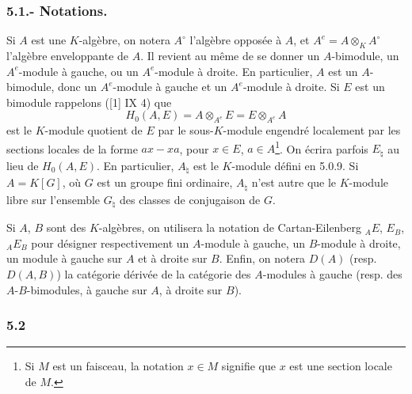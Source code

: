 \documentclass[11pt]{article}
\begin{document}
\subsubsection*{5.1.- Notations.}

Si $A$ est une $K$-algèbre, on notera $A^\circ$ l'algèbre opposée à $A$, et $A^e=A\otimes_KA^\circ$ l'algèbre enveloppante de $A$. Il revient au même de se donner un $A$-bimodule, un $A^e$-module à gauche, ou un $A^e$-module à droite. En particulier, $A$ est un $A$-bimodule, donc un $A^e$-module à gauche et un $A^e$-module à droite. Si $E$ est un bimodule rappelons ([1] IX 4) que
\[
H_0(A,E)=A\otimes_{A^e}E=E\otimes_{A^e}A
\]
est le $K$-module quotient de $E$ par le sous-$K$-module engendré localement par les sections locales de la forme $ax-xa$, pour $x\in E$, $a\in A$\footnote{Si $M$ est un faisceau, la notation $x\in M$ signifie que $x$ est une section locale de $M$.}. On écrira parfois $E_\natural$ au lieu de $H_0(A,E)$. En particulier, $A_\natural$ est le $K$-module défini en 5.0.9. Si $A=K[G]$, où $G$ est un groupe fini ordinaire, $A_\natural$ n'est autre que le $K$-module libre sur l'ensemble $G_\natural$ des classes de conjugaison de $G$.

Si $A$, $B$ sont des $K$-algèbres, on utilisera la notation de Cartan-Eilenberg ${}_AE$, $E_B$, ${}_AE_B$ pour désigner respectivement un $A$-module à gauche, un $B$-module à droite, un module à gauche sur $A$ et à droite sur $B$. Enfin, on notera $D(A)$ (resp. $D(A,B)$) la catégorie dérivée de la catégorie des $A$-modules à gauche (resp. des $A$-$B$-bimodules, à gauche sur $A$, à droite sur $B$).

\subsubsection*{5.2}
\end{document}

